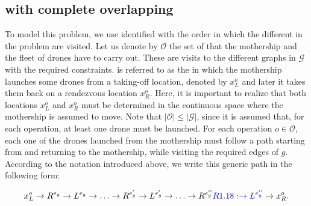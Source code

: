 \subsection{\AMD\xspace  with complete overlapping} \label{subsec:CO}
To model this problem, we use  identified with the order in which the different  in the problem are visited. Let us denote by $\mathcal O$ the set of  that the mothership and the fleet of drones have to carry out. These  are visits to the different graphs in $\mathcal G$ with the required constraints.  is referred to as the  in which the mothership launches some drones from a taking-off location, denoted by $x_L^o$ and later it takes them back on a rendezvous location $x_R^o$. Here, it is important to realize that both locations $x_L^o$ and $x_R^o$ must be determined in the continuous space where the mothership is assumed to move. Note that $|\mathcal O|\leq|\mathcal G|$, since it is assumed that, for each operation, at least one drone must be launched.
\noindent
For each operation $o\in\mathcal O$, each one of the drones launched from the mothership must follow a path starting from and returning to the mothership, while visiting the required edges of $g$. According to the notation introduced above, we write this generic path in the following form:

$$
x_L^o\rightarrow R^{e_g}\rightarrow L^{e_g}\rightarrow\ldots\rightarrow R^{e^\prime_g}\rightarrow L^{e^\prime_g}\rightarrow \ldots \rightarrow R^{e''_g} \RE{R1.18: \rightarrow L^{e''_g}} \rightarrow x_R^o. %
$$



